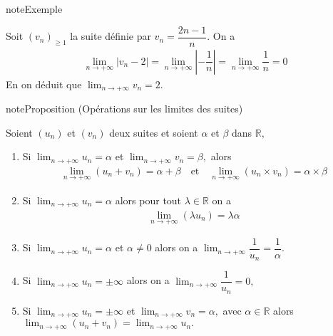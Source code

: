 \documentclass[letterpaper,10pt,french]{jupyterBook}
\begin{document}
\begin{sphinxadmonition}{note}{Exemple}

\sphinxAtStartPar
Soit \((v_n)_{\geq1}\) la suite définie par \(v_n=\dfrac{2n-1}{n}.\) On a
\begin{equation*}
\begin{split}
\lim_{n \rightarrow +\infty}|v_n-2|=\lim_{n \rightarrow +\infty}|-\dfrac{1}{n}|=\lim_{n \rightarrow +\infty}\dfrac{1}{n}=0
\end{split}
\end{equation*}
\sphinxAtStartPar
En on déduit que \(\lim_{n \rightarrow +\infty}v_n=2.\)
\end{sphinxadmonition}

\begin{sphinxadmonition}{note}{Proposition (Opérations sur les limites des suites)}

\sphinxAtStartPar
Soient \((u_n)\) et \((v_n)\) deux suites et soient \(\alpha\) et \(\beta\) dans \(\mathbb{R},\)
\begin{enumerate}
%
\item {} 
\sphinxAtStartPar
Si \(\lim_{n \rightarrow +\infty} u_n=\alpha\) et \(\lim_{n \rightarrow +\infty} v_n=\beta,\) alors
\begin{equation*}
\begin{split}
    \lim_{n \rightarrow +\infty}(u_n+v_n)=\alpha+\beta\quad\mbox{et}\quad \lim_{n \rightarrow +\infty}(u_n\times v_n)=\alpha\times \beta
    \end{split}
\end{equation*}
\item {} 
\sphinxAtStartPar
Si \(\lim_{n \rightarrow +\infty} u_n=\alpha\) alors pour tout \(\lambda\in \mathbb{R}\) on a
\begin{equation*}
\begin{split}
    \lim_{n \rightarrow +\infty} (\lambda u_n)=\lambda\alpha
    \end{split}
\end{equation*}
\item {} 
\sphinxAtStartPar
Si \(\lim_{n \rightarrow +\infty} u_n=\alpha\) et \(\alpha\neq0\) alors on a \(\lim_{n \rightarrow +\infty}\dfrac{1}{u_n}=\dfrac{1}{\alpha}.\)

\item {} 
\sphinxAtStartPar
Si \(\lim_{n \rightarrow +\infty} u_n=\pm\infty\) alors on a \(\lim_{n \rightarrow +\infty}\dfrac{1}{u_n}=0,\)

\item {} 
\sphinxAtStartPar
Si \(\lim_{n \rightarrow +\infty} u_n=\pm\infty\) et \(\lim_{n \rightarrow +\infty} v_n=\alpha,\) avec \(\alpha\in \mathbb{R}\) alors \(\lim_{n \rightarrow +\infty} (u_n+v_n)=\lim_{n \rightarrow +\infty} u_n.\)


\end{enumerate}
\end{sphinxadmonition}
\end{document}
